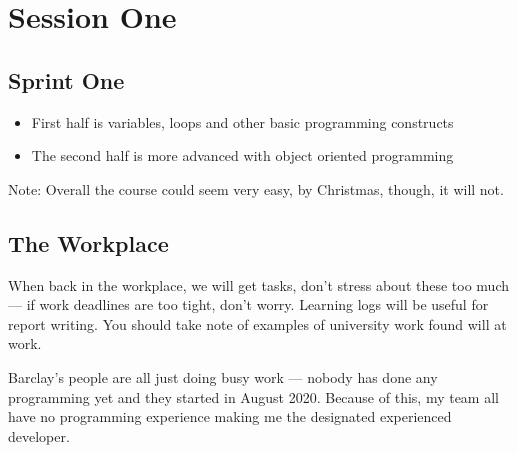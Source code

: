 \section{Session One}\label{sub:session_one}


\subsection{Sprint One}\label{ssub:sprint_one}

\begin{itemize}
	\item First half is variables, loops and other basic programming constructs
	\item The second half is more advanced with object oriented programming
\end{itemize}

\begin{note}
	Note: Overall the course could seem very easy, by Christmas, though, it will not.
\end{note}

\subsection{The Workplace}\label{ssub:the_workplace}

When back in the workplace, we will get tasks, don't stress about these too much --- if work deadlines are too tight, don't worry.
Learning logs will be useful for report writing.
You should take note of examples of university work found will at work.

Barclay's people are all just doing busy work --- nobody has done any programming yet and they started in August 2020. Because of this, my team all have no programming experience making me the designated experienced developer.
